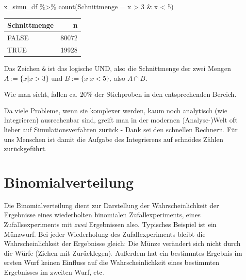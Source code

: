 \documentclass[
  a4paper,
  DIV=11]{scrreprt}
\newenvironment{Shaded}{\begin{snugshade}}{\end{snugshade}}
\newcommand{\AttributeTok}[1]{\textcolor[rgb]{0.40,0.45,0.13}{#1}}
\newcommand{\DecValTok}[1]{\textcolor[rgb]{0.68,0.00,0.00}{#1}}
\newcommand{\FunctionTok}[1]{\textcolor[rgb]{0.28,0.35,0.67}{#1}}
\newcommand{\NormalTok}[1]{\textcolor[rgb]{0.00,0.23,0.31}{#1}}
\newcommand{\SpecialCharTok}[1]{\textcolor[rgb]{0.37,0.37,0.37}{#1}}
\theoremstyle{definition}
\theoremstyle{remark}
\begin{document}
\begin{Shaded}
\begin{Highlighting}[]
\NormalTok{x\_simu\_df }\SpecialCharTok{\%\textgreater{}\%} 
  \FunctionTok{count}\NormalTok{(}\AttributeTok{Schnittmenge =}\NormalTok{ x }\SpecialCharTok{\textgreater{}} \DecValTok{3} \SpecialCharTok{\&}\NormalTok{ x }\SpecialCharTok{\textless{}} \DecValTok{5}\NormalTok{)}
\end{Highlighting}
\end{Shaded}

\begin{longtable}[]{@{}lr@{}}
\toprule()
Schnittmenge & n \\
\midrule()
\endhead
FALSE & 80072 \\
TRUE & 19928 \\
\bottomrule()
\end{longtable}

Das Zeichen \texttt{\&} ist das logische UND, also die Schnittmenge der
zwei Mengen \(A := \{x|x>3\}\) und \(B := \{x|x<5\}\), also
\(A \cap B\).

Wie man sieht, fallen ca. 20\% der Stichproben in den entsprechenden
Bereich.

Da viele Probleme, wenn sie komplexer werden, kaum noch analytisch (wie
Integrieren) ausrechenbar sind, greift man in der modernen
(Analyse-)Welt oft lieber auf Simulationsverfahren zurück - Dank sei den
schnellen Rechnern. Für uns Menschen ist damit die Aufgabe des
Integrierens auf schnödes Zählen zurückgeführt.

\hypertarget{sec-bin-distrib}{%
\section{Binomialverteilung}\label{sec-bin-distrib}}

\begin{tcolorbox}[enhanced jigsaw, title=\textcolor{quarto-callout-important-color}{\faExclamation}\hspace{0.5em}{Wichtig}, bottomtitle=1mm, bottomrule=.15mm, titlerule=0mm, colbacktitle=quarto-callout-important-color!10!white, colframe=quarto-callout-important-color-frame, leftrule=.75mm, left=2mm, toprule=.15mm, colback=white, arc=.35mm, breakable, toptitle=1mm, opacityback=0, rightrule=.15mm, coltitle=black, opacitybacktitle=0.6]

Die Binomialverteilung dient zur Darstellung der Wahrscheinlichkeit der
Ergebnisse eines wiederholten binomialen Zufallexperiments, eines
Zufallsexperiments mit \emph{zwei} Ergebnissen also. Typisches Beispiel
ist ein Münzwurf. Bei jeder Wiederholung des Zufallexperiments bleibt
die Wahrscheinlichkeit der Ergebnisse gleich: Die Münze verändert sich
nicht durch die Würfe (Ziehen mit Zurücklegen). Außerdem hat ein
bestimmtes Ergebnis im ersten Wurf keinen Einfluss auf die
Wahrscheinlichkeit eines bestimmten Ergebnisses im zweiten Wurf, etc.

\end{tcolorbox}
\end{document}
